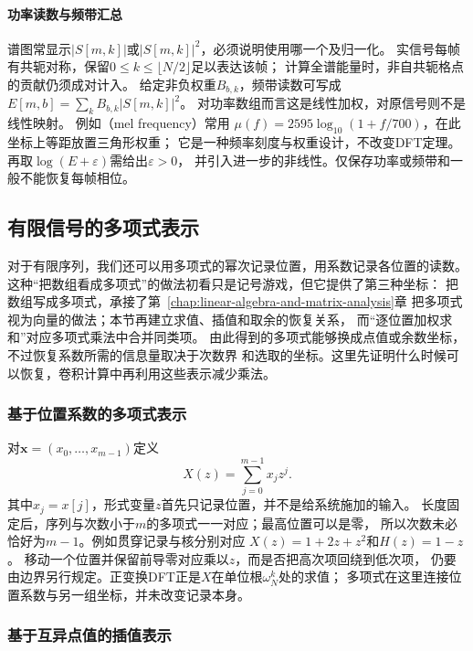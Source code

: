 \paragraph{功率读数与频带汇总}
谱图常显示$|S[m,k]|$或$|S[m,k]|^2$，必须说明使用哪一个及归一化。
实信号每帧有共轭对称，保留$0\leq k\leq\lfloor N/2\rfloor$足以表达该帧；
计算全谱能量时，非自共轭格点的贡献仍须成对计入。
给定非负权重$B_{b,k}$，频带读数可写成
$E[m,b]=\sum_k B_{b,k}|S[m,k]|^2$。
对功率数组而言这是线性加权，对原信号则不是线性映射。
例如（mel frequency）常用
$\mu(f)=2595\log_{10}(1+f/700)$，在此坐标上等距放置三角形权重；
它是一种频率刻度与权重设计，不改变DFT定理。
再取$\log(E+\varepsilon)$需给出$\varepsilon>0$，
并引入进一步的非线性。仅保存功率或频带和一般不能恢复每帧相位。

\subsection{有限信号的多项式表示}
\label{sec:signal-analysis-polynomial-arithmetic}

对于有限序列，我们还可以用多项式的幂次记录位置，用系数记录各位置的读数。
这种“把数组看成多项式”的做法初看只是记号游戏，但它提供了第三种坐标：
把数组写成多项式，承接了第~\ref{chap:linear-algebra-and-matrix-analysis}章
把多项式视为向量的做法；本节再建立求值、插值和取余的恢复关系，
而“逐位置加权求和”对应多项式乘法中合并同类项。
由此得到的多项式能够换成点值或余数坐标，不过恢复系数所需的信息量取决于次数界
和选取的坐标。这里先证明什么时候可以恢复，卷积计算中再利用这些表示减少乘法。

\subsubsection{基于位置系数的多项式表示}

对$\bm x=(x_0,\ldots,x_{m-1})$定义
\[
  X(z)=\sum_{j=0}^{m-1}x_jz^j.
\]
其中$x_j=x[j]$，形式变量$z$首先只记录位置，并不是给系统施加的输入。
长度固定后，序列与次数小于$m$的多项式一一对应；最高位置可以是零，
所以次数未必恰好为$m-1$。例如贯穿记录与核分别对应
$X(z)=1+2z+z^2$和$H(z)=1-z$。
移动一个位置并保留前导零对应乘以$z$，而是否把高次项回绕到低次项，
仍要由边界另行规定。正变换DFT正是$X$在单位根$\omega_N^k$处的求值；
多项式在这里连接位置系数与另一组坐标，并未改变记录本身。

\subsubsection{基于互异点值的插值表示}

